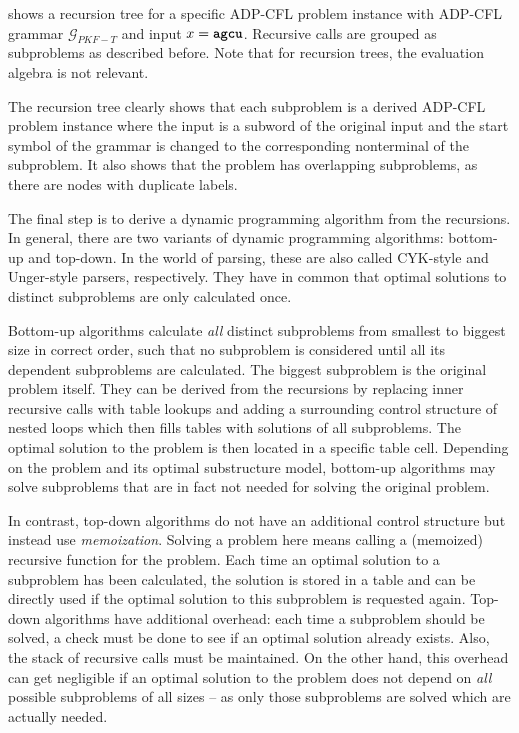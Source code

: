 \documentclass[
    a4paper,
    12pt,
    twoside,
    BCOR=12mm,
    parskip=half,
    chapterprefix,
    numbers=noenddot,
    bibliography=totoc
]{scrbook}
\begin{document}
 shows a recursion tree for a specific ADP-CFL problem instance with ADP-CFL grammar $\mathcal{G}_{PKF-T}$ and input $x=\ts{agcu}$. Recursive calls are grouped as subproblems as described before. Note that for recursion trees, the evaluation algebra is not relevant.

The recursion tree clearly shows that each subproblem is a derived ADP-CFL problem instance where the input is a subword of the original input and the start symbol of the grammar is changed to the corresponding nonterminal of the subproblem. It also shows that the problem has overlapping subproblems, as there are nodes with duplicate labels.


The final step is to derive a dynamic programming algorithm from the recursions. In general, there are two variants of dynamic programming algorithms: bottom-up and top-down. In the world of parsing, these are also called CYK-style and Unger-style parsers, respectively. They have in common that optimal solutions to distinct subproblems are only calculated once.

Bottom-up algorithms calculate \emph{all} distinct subproblems from smallest to biggest size in correct order, such that no subproblem is considered until all its dependent subproblems are calculated. The biggest subproblem is the original problem itself. They can be derived from the recursions by replacing inner recursive calls with table lookups and adding a surrounding control structure of nested loops which then fills tables with solutions of all subproblems. The optimal solution to the problem is then located in a specific table cell. Depending on the problem and its optimal substructure model, bottom-up algorithms may solve subproblems that are in fact not needed for solving the original problem.

In contrast, top-down algorithms do not have an additional control structure but instead use \emph{memoization}. Solving a problem here means calling a (memoized) recursive function for the problem. Each time an optimal solution to a subproblem has been calculated, the solution is stored in a table and can be directly used if the optimal solution to this subproblem is requested again. Top-down algorithms have additional overhead: each time a subproblem should be solved, a check must be done to see if an optimal solution already exists. Also, the stack of recursive calls must be maintained. On the other hand, this overhead can get negligible if an optimal solution to the problem does not depend on \emph{all} possible subproblems of all sizes -- as only those subproblems are solved which are actually needed.
\end{document}
